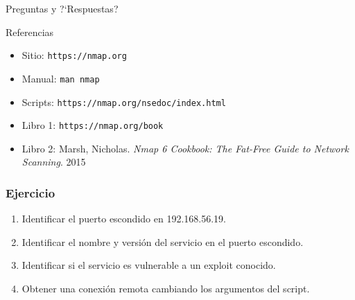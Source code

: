 \documentclass[aspectratio=169]{beamer}
\begin{document}
\begin{frame}
    \begin{block}{}
        \huge
        \begin{center}
            Preguntas y ?`Respuestas?
        \end{center}
    \end{block}

    \begin{block}{Referencias}
        \begin{itemize}
            \item Sitio: \texttt{https://nmap.org}
            \item Manual: \texttt{man nmap}
            \item Scripts: \texttt{https://nmap.org/nsedoc/index.html}
            \item Libro 1: \texttt{https://nmap.org/book}
            \item Libro 2: Marsh, Nicholas. \textit{Nmap 6 Cookbook: The Fat-Free Guide to Network Scanning}. 2015
        \end{itemize}
    \end{block}

\end{frame}

\begin{frame}
    \frametitle{Ejercicio}

    \begin{enumerate}
    \item Identificar el puerto escondido en 192.168.56.19.
    \item Identificar el nombre y versi\'on del servicio en el puerto escondido.
    \item Identificar si el servicio es vulnerable a un exploit conocido.
    \item Obtener una conexi\'on remota cambiando los argumentos del script. 
    \end{enumerate}

\end{frame}
\end{document}
